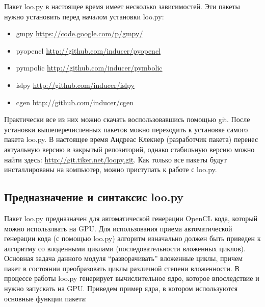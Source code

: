 \documentclass{scrartcl}
\begin{document}
Пакет loo.py в настоящее время имеет несколько зависимостей. Эти пакеты нужно 
установить перед началом установки loo.py:
\begin{itemize}
\item gmpy \href{https://code.google.com/p/gmpy/}{https://code.google.com/p/gmpy/}
\item pyopencl \hyperref[http-github.com-inducer-pyopencl]{ http://github.com/inducer/pyopencl}
\item pympolic \href{http://github.com/inducer/pymbolic}{http://github.com/inducer/pymbolic}
\item islpy \href{http://github.com/inducer/islpy}{http://github.com/inducer/islpy}
\item cgen \href{http://github.com/inducer/cgen}{http://github.com/inducer/cgen}
\end{itemize}
Практически все из них можно скачать воспользовавшись помощью git. После 
установки вышеперечисленных пакетов можно переходить к установке самого пакета loo.py.
В настоящее время Андреас Клекнер (разработчик пакета) перенес актуальную версию 
в закрытый репозиторий, однако стабильную версию можно найти здесь: \href{http://git.tiker.net/loopy.git}{http://git.tiker.net/loopy.git}.
Как только все пакеты будут инсталлированы на компьютер, можно приступать к работе с loo.py.
\subsection{Предназначение и синтаксис loo.py}
\label{sec-7-2}

Пакет loo.py предназначен для автоматической генерации OpenCL кода, который можно 
использлвать на GPU. Для использования приема автоматической генерации кода 
(с помощью loo.py) алгоритм изначально должен быть приведен к алгоритму 
со влоденными циклами (последовательности вложенных циклов).
 Основная задача данного модуля ``разворачивать'' вложенные циклы,
причем пакет в состоянии преобразовать циклы различной степени вложенности. В
процессе работы loo.py генерирует вычислительное ядро, которое впоследствие и
нужно запускать на GPU. Приведем пример ядра, в котором используются основные функции
пакета:
\end{document}
